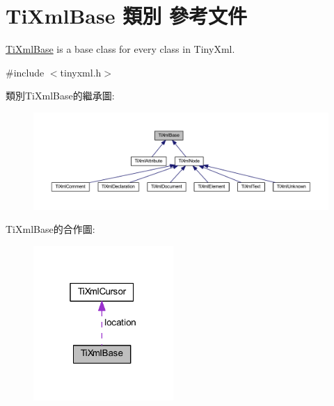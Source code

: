 \hypertarget{class_ti_xml_base}{}\section{Ti\+Xml\+Base 類別 參考文件}
\label{class_ti_xml_base}


\hyperlink{class_ti_xml_base}{Ti\+Xml\+Base} is a base class for every class in Tiny\+Xml.  




{\ttfamily \#include $<$tinyxml.\+h$>$}



類別\+Ti\+Xml\+Base的繼承圖\+:\nopagebreak
\begin{figure}[H]
\begin{center}
\leavevmode
\includegraphics[width=350pt]{class_ti_xml_base__inherit__graph}
\end{center}
\end{figure}


Ti\+Xml\+Base的合作圖\+:\nopagebreak
\begin{figure}[H]
\begin{center}
\leavevmode
\includegraphics[width=151pt]{class_ti_xml_base__coll__graph}
\end{center}
\end{figure}
